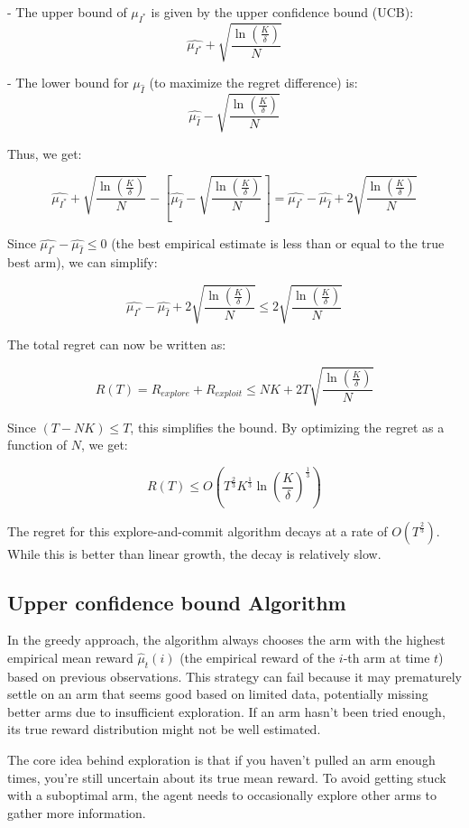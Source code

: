 - The upper bound of $\mu_{I^*}$ is given by the upper confidence bound (UCB):
$$
    \hat{\mu_{I^*}} + \sqrt{\frac{\ln(\frac{K}{\delta})}{N}}
$$

- The lower bound for $\mu_{\hat{I}}$ (to maximize the regret difference) is:
$$
    \hat{\mu_{\hat{I}}} - \sqrt{\frac{\ln(\frac{K}{\delta})}{N}}
$$

Thus, we get:

$$
    \hat{\mu_{I^*}} + \sqrt{\frac{\ln(\frac{K}{\delta})}{N}} - [\hat{\mu_{\hat{I}}} - \sqrt{\frac{\ln(\frac{K}{\delta})}{N}}] = \hat{\mu_{I^*}} - \hat{\mu_{\hat{I}}} + 2\sqrt{\frac{\ln(\frac{K}{\delta})}{N}}
$$

Since $\hat{\mu_{I^*}} - \hat{\mu_{\hat{I}}} \leq 0$ (the best empirical estimate is less than or equal to the true best arm), we can simplify:

$$
    \hat{\mu_{I^*}} - \hat{\mu_{\hat{I}}} + 2\sqrt{\frac{\ln(\frac{K}{\delta})}{N}} \leq 2\sqrt{\frac{\ln(\frac{K}{\delta})}{N}}
$$

The total regret can now be written as:

$$
    R(T) = R_{explore} + R_{exploit} \leq NK + 2T\sqrt{\frac{\ln(\frac{K}{\delta})}{N}}
$$

Since $(T - NK) \leq T$, this simplifies the bound. By optimizing the regret as a function of $N$, we get:

$$
    R(T) \leq O(T^{\frac{2}{3}} K^{\frac{1}{3}} \ln(\frac{K}{\delta})^{\frac{1}{3}})
$$

The regret for this explore-and-commit algorithm decays at a rate of $O(T^{\frac{2}{3}})$. While this is better than linear growth, the decay is relatively slow.

\subsection{Upper confidence bound Algorithm}

In the greedy approach, the algorithm always chooses the arm with the highest empirical mean reward $\hat{\mu}_t(i)$ (the empirical reward of the $i$-th arm at time $t$) based on previous observations. This strategy can fail because it may prematurely settle on an arm that seems good based on limited data, potentially missing better arms due to insufficient exploration. If an arm hasn’t been tried enough, its true reward distribution might not be well estimated.

The core idea behind exploration is that if you haven't pulled an arm enough times, you're still uncertain about its true mean reward. To avoid getting stuck with a suboptimal arm, the agent needs to occasionally explore other arms to gather more information.

